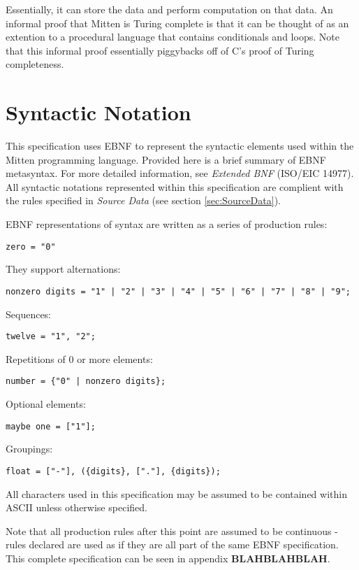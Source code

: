 \documentclass[10pt,a4paper]{article}
\begin{document}
Essentially, it can store the data and perform computation on that data. An informal proof that Mitten is Turing complete is that it can be thought of as an extention to a procedural language that contains conditionals and loops. Note that this informal proof essentially piggybacks off of C's proof of Turing completeness.

\newpage




\section{Syntactic Notation}
This specification uses EBNF to represent the syntactic elements used within the Mitten programming language. Provided here is a brief summary of EBNF metasyntax. For more detailed information, see \textit{Extended BNF} (ISO/EIC 14977). All syntactic notations represented within this specification are complient with the rules specified in \textit{Source Data} (see section \ref{sec:SourceData}).

EBNF representations of syntax are written as a series of production rules:
\begin{verbatim}
zero = "0"
\end{verbatim}

They support alternations:
\begin{verbatim}
nonzero digits = "1" | "2" | "3" | "4" | "5" | "6" | "7" | "8" | "9";
\end{verbatim}

Sequences:
\begin{verbatim}
twelve = "1", "2";
\end{verbatim}

Repetitions of 0 or more elements:
\begin{verbatim}
number = {"0" | nonzero digits};
\end{verbatim}

Optional elements:
\begin{verbatim}
maybe one = ["1"];
\end{verbatim}

Groupings:
\begin{verbatim}
float = ["-"], ({digits}, ["."], {digits});
\end{verbatim}

All characters used in this specification may be assumed to be contained within ASCII unless otherwise specified.

Note that all production rules after this point are assumed to be continuous - rules declared are used as if they are all part of the same EBNF specification. This complete specification can be seen in appendix \textbf{BLAHBLAHBLAH}.
\newpage
\end{document}
